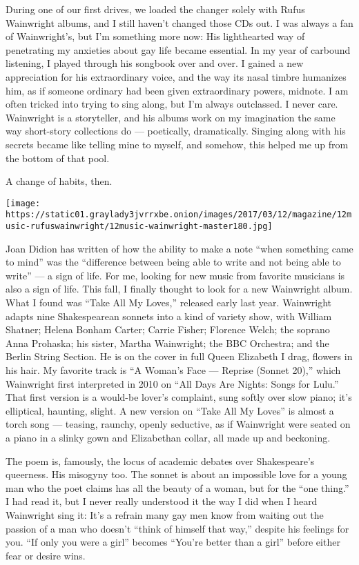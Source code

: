 During one of our first drives, we loaded the changer solely with Rufus
Wainwright albums, and I still haven't changed those CDs out. I was
always a fan of Wainwright's, but I'm something more now: His
lighthearted way of penetrating my anxieties about gay life became
essential. In my year of carbound listening, I played through his
songbook over and over. I gained a new appreciation for his
extraordinary voice, and the way its nasal timbre humanizes him, as if
someone ordinary had been given extraordinary powers, midnote. I am
often tricked into trying to sing along, but I'm always outclassed. I
never care. Wainwright is a storyteller, and his albums work on my
imagination the same way short-story collections do --- poetically,
dramatically. Singing along with his secrets became like telling mine to
myself, and somehow, this helped me up from the bottom of that pool.

A change of habits, then.

\texttt{[image: https://static01.graylady3jvrrxbe.onion/images/2017/03/12/magazine/12music-rufuswainwright/12music-wainwright-master180.jpg]}

Joan Didion has written of how the ability to make a note ``when
something came to mind'' was the ``difference between being able to
write and not being able to write'' --- a sign of life. For me, looking
for new music from favorite musicians is also a sign of life. This fall,
I finally thought to look for a new Wainwright album. What I found was
``Take All My Loves,'' released early last year. Wainwright adapts nine
Shakespearean sonnets into a kind of variety show, with William Shatner;
Helena Bonham Carter; Carrie Fisher; Florence Welch; the soprano Anna
Prohaska; his sister, Martha Wainwright; the BBC Orchestra; and the
Berlin String Section. He is on the cover in full Queen Elizabeth I
drag, flowers in his hair. My favorite track is ``A Woman's Face ---
Reprise (Sonnet 20),'' which Wainwright first interpreted in 2010 on
``All Days Are Nights: Songs for Lulu.'' That first version is a
would-be lover's complaint, sung softly over slow piano; it's
elliptical, haunting, slight. A new version on ``Take All My Loves'' is
almost a torch song --- teasing, raunchy, openly seductive, as if
Wainwright were seated on a piano in a slinky gown and Elizabethan
collar, all made up and beckoning.

The poem is, famously, the locus of academic debates over Shakespeare's
queerness. His misogyny too. The sonnet is about an impossible love for
a young man who the poet claims has all the beauty of a woman, but for
the ``one thing.'' I had read it, but I never really understood it the
way I did when I heard Wainwright sing it: It's a refrain many gay men
know from waiting out the passion of a man who doesn't ``think of
himself that way,'' despite his feelings for you. ``If only you were a
girl'' becomes ``You're better than a girl'' before either fear or
desire wins.

